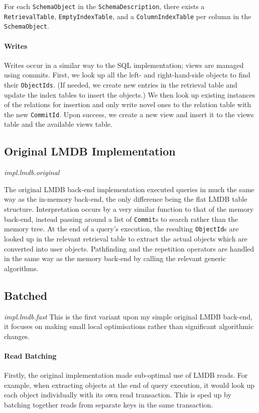 \documentclass[12pt,a4paper,twoside,openright]{report}
\newcommand\codeName[1]{\texttt{#1}}
\newcommand\note[1]{\textit{#1}}
\let\oldparagraph\paragraph
\renewcommand{\paragraph}[1]{\oldparagraph{#1}\mbox{}}
\begin{document}
For each \codeName{SchemaObject} in the \codeName{SchemaDescription}, there exists a \codeName{RetrievalTable}, \codeName{EmptyIndexTable}, and a \codeName{ColumnIndexTable} per column in the \codeName{SchemaObject}.
		
		
		\paragraph{Writes}
		Writes occur in a similar way to the SQL implementation; views are managed using commits. First, we look up all the left- and right-hand-side objects to find their \codeName{ObjectIds}. (If needed, we create new entries in the retrieval table and update the index tables to insert the objects.) We then look up existing instances of the relations for insertion and only write novel ones to the relation table with the new \codeName{CommitId}. Upon success, we create a new view and insert it to the views table and the available views table.

	\subsection{Original LMDB Implementation}
	\note{impl.lmdb.original}

The original LMDB back-end implementation executed queries in much the same way as the in-memory back-end, the only difference being the flat LMDB table structure. Interpretation occurs by a very similar function to that of the memory back-end, instead passing around a list of \codeName{Commit}s to search rather than the memory tree. At the end of a query's execution, the resulting \codeName{ObjectId}s are looked up in the relevant retrieval table to extract the actual objects which are converted into user objects. Pathfinding and the repetition operators are handled in the same way as the memory back-end by calling the relevant generic algorithms.
 

	\subsection{Batched}
	\note{impl.lmdb.fast}
	This is the first variant upon my simple original LMDB back-end, it focuses on making small local optimisations rather than significant algorithmic changes.
	
		\paragraph{Read Batching}
		Firstly, the original implementation made sub-optimal use of LMDB reads. For example, when extracting objects at the end of query execution, it would look up each object individually with its own read transaction. This is sped up by batching together reads from separate keys in the same transaction.
		
\end{document}
